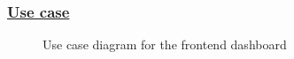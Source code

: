 \subsubsection*{\underline{Use case}}
\begin{figure}[H]
    \centering
    \caption{Use case diagram for the frontend dashboard}
    \label{fig:use-case-diagram}
\end{figure}


